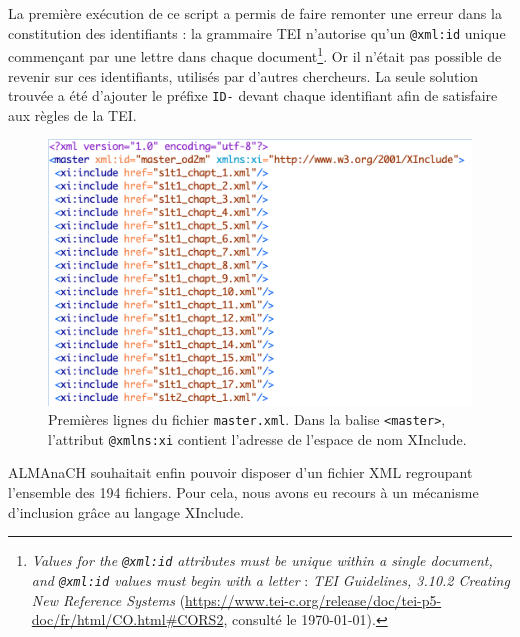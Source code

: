 La première exécution de ce script a permis de faire remonter une erreur dans la constitution des identifiants : la grammaire TEI n'autorise qu'un \texttt{@xml:id} unique commençant par une lettre dans chaque document\footnote{\og \textit{Values for the \texttt{@xml:id} attributes must be unique within a single document, and \texttt{@xml:id} values must begin with a letter}\fg{} : \textit{TEI Guidelines, 3.10.2 Creating New Reference Systems} (\url{https://www.tei-c.org/release/doc/tei-p5-doc/fr/html/CO.html\#CORS2}, consulté le \today).}. Or il n'était pas possible de revenir sur ces identifiants, utilisés par d'autres chercheurs. La seule solution trouvée a été d'ajouter le préfixe \texttt{ID-} devant chaque identifiant afin de satisfaire aux règles de la TEI.

\begin{figure}
    \centering
    \includegraphics[width=15cm]{img/xinclude.png}
    \caption{Premières lignes du fichier \texttt{master.xml}. Dans la balise \texttt{<master>}, l'attribut \texttt{@xmlns:xi} contient l'adresse de l'espace de nom XInclude.}
    \label{fig:xinclude}
\end{figure}

ALMAnaCH souhaitait enfin pouvoir disposer d'un fichier XML regroupant l'ensemble des 194 fichiers. Pour cela, nous avons eu recours à un mécanisme d'inclusion grâce au langage XInclude.

